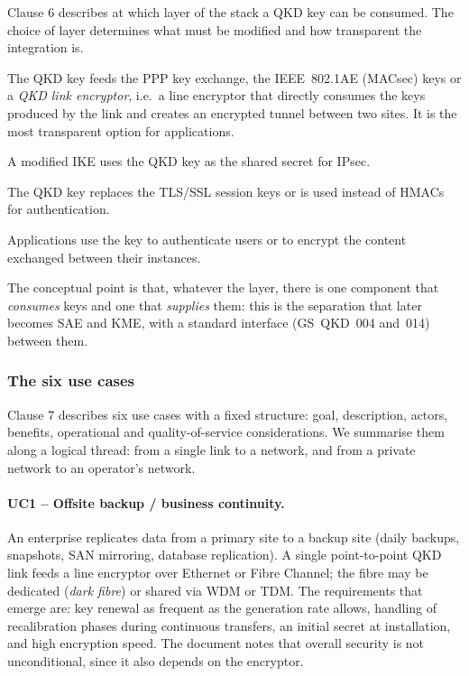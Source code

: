 Clause 6 describes at which layer of the stack a QKD key can be consumed.
The choice of layer determines what must be modified and how transparent
the integration is.

\begin{description}[style=nextline,leftmargin=1.2em]
  \item[Data link layer (L2)] The QKD key feeds the PPP key exchange, the
        IEEE~802.1AE (MACsec) keys or a \emph{QKD link encryptor}, i.e.\ a
        line encryptor that directly consumes the keys produced by the link
        and creates an encrypted tunnel between two sites. It is the most
        transparent option for applications.
  \item[Network layer (L3)] A modified IKE uses the QKD key as the shared
        secret for IPsec.
  \item[Transport layer (L4)] The QKD key replaces the TLS/SSL session keys
        or is used instead of HMACs for authentication.
  \item[Application layer] Applications use the key to authenticate users
        or to encrypt the content exchanged between their instances.
\end{description}

The conceptual point is that, whatever the layer, there is one component
that \emph{consumes} keys and one that \emph{supplies} them: this is the
separation that later becomes SAE and KME, with a standard interface
(GS~QKD~004 and~014) between them.

\subsubsection{The six use cases}

Clause 7 describes six use cases with a fixed structure: goal,
description, actors, benefits, operational and quality-of-service
considerations. We summarise them along a logical thread: from a single
link to a network, and from a private network to an operator's network.

\paragraph{UC1 – Offsite backup / business continuity.}
An enterprise replicates data from a primary site to a backup site (daily
backups, snapshots, SAN mirroring, database replication). A single
point-to-point QKD link feeds a line encryptor over Ethernet or Fibre
Channel; the fibre may be dedicated (\emph{dark fibre}) or shared via WDM
or TDM. The requirements that emerge are: key renewal as frequent as the
generation rate allows, handling of recalibration phases during continuous
transfers, an initial secret at installation, and high encryption speed.
The document notes that overall security is not unconditional, since it
also depends on the encryptor.

